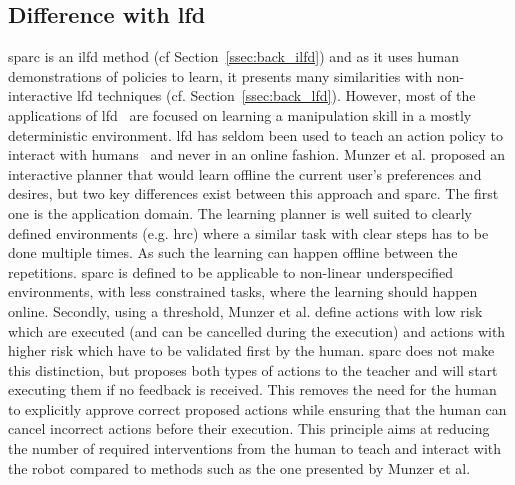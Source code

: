 \subsection{Difference with \gls{lfd}}

\gls{sparc} is an \gls{ilfd} method (cf Section~\ref{ssec:back_ilfd}) and as it uses human demonstrations of policies to learn, it presents many similarities with non-interactive \gls{lfd} techniques (cf. Section~\ref{ssec:back_lfd}). However, most of the applications of \gls{lfd}~\citep{argall2009survey,billard2008robot} are focused on learning a manipulation skill in a mostly deterministic environment. \gls{lfd} has seldom been used to teach an action policy to interact with humans~\citep{liu2014train,sequeira2016discovering,munzer2017efficient} and never in an online fashion. Munzer et al. proposed an interactive planner that would learn offline the current user's preferences and desires, but two key differences exist between this approach and \gls{sparc}. The first one is the application domain. The learning planner is well suited to clearly defined environments (e.g. \gls{hrc}) where a similar task with clear steps has to be done multiple times. As such the learning can happen offline between the repetitions. \gls{sparc} is defined to be applicable to non-linear underspecified environments, with less constrained tasks, where the learning should happen online. Secondly, using a threshold, Munzer et al. define actions with low risk which are executed (and can be cancelled during the execution) and actions with higher risk which have to be validated first by the human. \gls{sparc} does not make this distinction, but proposes both types of actions to the teacher and will start executing them if no feedback is received. This removes the  need for the human to explicitly approve correct proposed actions while ensuring that the human can cancel incorrect actions before their execution. This principle aims at reducing the number of required interventions from the human to teach and interact with the robot compared to methods such as the one presented by Munzer et al. 

    

